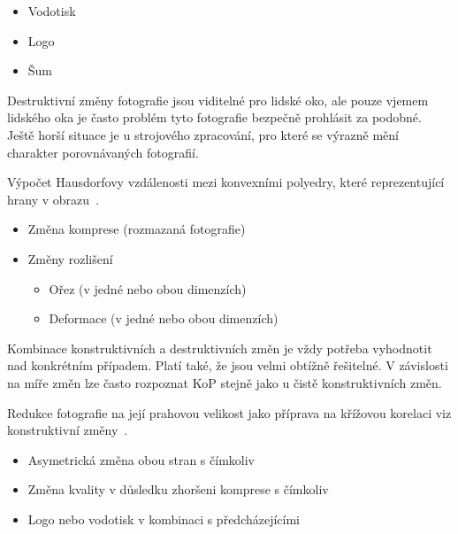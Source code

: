 \begin{itemize}
	\setlength{\parskip}{0pt}
	\setlength{\itemsep}{0pt}
	\item{Vodotisk}
	\item{Logo}
	\item{Šum}
\end{itemize}

Destruktivní změny fotografie jsou viditelné pro lidské oko, ale pouze vjemem lidského oka je často problém tyto fotografie bezpečně prohlásit za podobné. Ještě horší situace je u strojového zpracování, pro které se výrazně mění charakter porovnávaných fotografií.

Výpočet Hausdorfovy vzdálenosti mezi konvexními polyedry, které reprezentující hrany v obrazu~\cite{FFT-technique}.

\begin{itemize}
	\setlength{\parskip}{0pt}
	\setlength{\itemsep}{0pt}
	\item{Změna komprese (rozmazaná fotografie)}
	\item{Změny rozlišení}
	\begin{itemize}
		\item{Ořez (v jedné nebo obou dimenzích)}
		\item{Deformace (v jedné nebo obou dimenzích)}
	\end{itemize}
\end{itemize}

Kombinace konstruktivních a destruktivních změn je vždy potřeba vyhodnotit nad konkrétním případem. Platí také, že jsou velmi obtížně řešitelné. V závislosti na míře změn lze často rozpoznat KoP stejně jako u čistě konstruktivních změn.

Redukce fotografie na její prahovou velikost jako příprava na křížovou korelaci viz konstruktivní změny~\cite{fftw3}.

\begin{itemize}
	\setlength{\parskip}{0pt}
	\setlength{\itemsep}{0pt}
	\item {Asymetrická změna obou stran s čímkoliv}
	\item {Změna kvality v důsledku zhoršeni komprese s čímkoliv}
	\item {Logo nebo vodotisk v kombinaci s předcházejícími}
\end{itemize}

